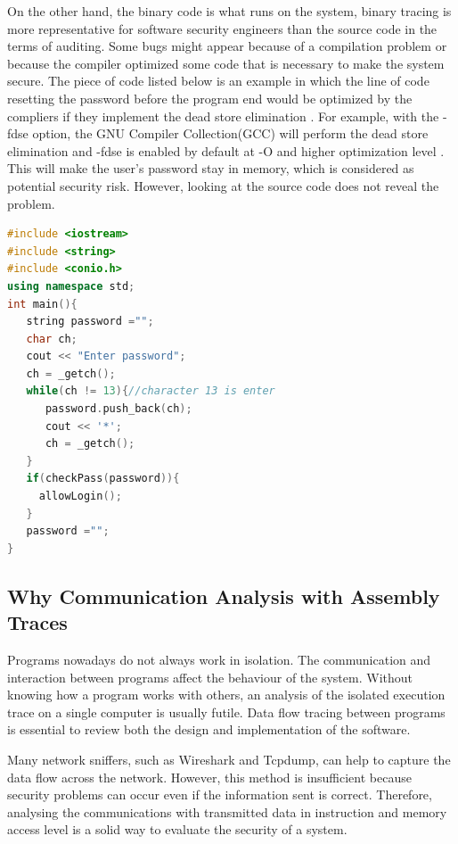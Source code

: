 On the other hand, the binary code is what runs on the system, binary tracing is more representative for software security engineers than the source code in the terms of auditing. Some bugs might appear because of a compilation problem or because the compiler optimized some code that is necessary to make the system secure. The piece of code listed below is an example in which the line of code resetting the password before the program end would be optimized by the compliers if they implement the dead store elimination \cite{howard2003writing}. For example, with the -fdse option, the GNU Compiler Collection(GCC) will perform the dead store elimination and -fdse is enabled by default at -O and higher optimization level \cite{gcc}. This will make the user's password stay in memory, which is considered as potential security risk. However, looking at the source code does not reveal the problem.

\begin{lstlisting}[language=C++, caption= Password Fetching Example ]
#include <iostream>
#include <string>
#include <conio.h>
using namespace std;
int main(){
   string password ="";
   char ch;
   cout << "Enter password";
   ch = _getch();
   while(ch != 13){//character 13 is enter
      password.push_back(ch);
      cout << '*';
      ch = _getch();
   }   
   if(checkPass(password)){
     allowLogin();
   }  
   password ="";
}
\end{lstlisting}

\subsection{Why Communication Analysis with Assembly Traces}
Programs nowadays do not always work in isolation. The communication and interaction between programs affect the behaviour of the system. Without knowing how a program works with others, an analysis of the isolated execution trace on a single computer is usually futile. Data flow tracing between programs is essential to review both the design and implementation of the software.

Many network sniffers, such as Wireshark\cite{_wireshark_????} and Tcpdump\cite{tcpdump_tcpdump/libpcap_????}, can help to capture the data flow across the network. However, this method  is insufficient because security problems can occur even if the information sent is correct. Therefore, analysing the communications with transmitted data in instruction and memory access level is a solid way to evaluate the security of a system.

